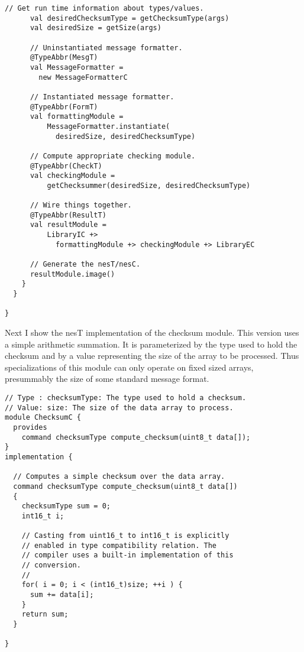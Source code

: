 \begin{lstlisting}[language=scalaness]
      // Get run time information about types/values.
      val desiredChecksumType = getChecksumType(args)
      val desiredSize = getSize(args)

      // Uninstantiated message formatter.
      @TypeAbbr(MesgT)
      val MessageFormatter =
        new MessageFormatterC

      // Instantiated message formatter.
      @TypeAbbr(FormT)
      val formattingModule =
          MessageFormatter.instantiate(
            desiredSize, desiredChecksumType)

      // Compute appropriate checking module.
      @TypeAbbr(CheckT)
      val checkingModule =
          getChecksummer(desiredSize, desiredChecksumType)
      
      // Wire things together.
      @TypeAbbr(ResultT)
      val resultModule =
          LibraryIC +>
            formattingModule +> checkingModule +> LibraryEC

      // Generate the nesT/nesC.
      resultModule.image()
    }
  }

}       
\end{lstlisting}
\vspace{1.0ex}
\primaryspacing

Next I show the nesT implementation of the checksum module. This version uses a simple
arithmetic summation. It is parameterized by the type used to hold the checksum and by a value
representing the size of the array to be processed. Thus specializations of this module can only
operate on fixed sized arrays, presummably the size of some standard message format.

\singlespace
\vspace{1.0ex}
\begin{lstlisting}[language=nesC]
// Type : checksumType: The type used to hold a checksum.
// Value: size: The size of the data array to process.
module ChecksumC {
  provides
    command checksumType compute_checksum(uint8_t data[]);
}
implementation {
   
  // Computes a simple checksum over the data array.
  command checksumType compute_checksum(uint8_t data[])
  {
    checksumType sum = 0;
    int16_t i;
        
    // Casting from uint16_t to int16_t is explicitly
    // enabled in type compatibility relation. The
    // compiler uses a built-in implementation of this
    // conversion.
    //
    for( i = 0; i < (int16_t)size; ++i ) {
      sum += data[i];
    }
    return sum;
  }
    
}
\end{lstlisting}
\vspace{1.0ex}
\primaryspacing

